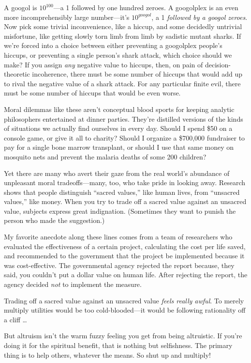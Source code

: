 {
 A googol is $10^{100}$---a 1 followed by one
hundred zeroes. A googolplex is an even more incomprehensibly large
number---it's $10^{googol}$, a 1
\textit{followed by a googol zeroes}. Now pick some trivial
inconvenience, like a hiccup, and some decidedly untrivial misfortune,
like getting slowly torn limb from limb by sadistic mutant sharks. If
we're forced into a choice between either preventing a
googolplex people's hiccups, or preventing a single
person's shark attack, which choice should we make? If
you assign \textit{any} negative value to hiccups, then, on pain of
decision-theoretic incoherence, there must be some number of hiccups
that would add up to rival the negative value of a shark attack. For
any particular finite evil, there must be some number of hiccups that
would be even worse.}

{
 Moral dilemmas like these aren't conceptual blood
sports for keeping analytic philosophers entertained at dinner parties.
They're distilled versions of the kinds of situations
we actually find ourselves in every day. Should I spend \$50 on a
console game, or give it all to charity? Should I organize a \$700,000
fundraiser to pay for a single bone marrow transplant, or should I use
that same money on mosquito nets and prevent the malaria deaths of some
200 children?}

{
 Yet there are many who avert their gaze from the real
world's abundance of unpleasant moral tradeoffs---many,
too, who take pride in looking away. Research shows that people
distinguish ``sacred values,'' like
human lives, from ``unsacred
values,'' like money. When you try to trade off a
sacred value against an unsacred value, subjects express great
indignation. (Sometimes they want to punish the person who made the
suggestion.)}

{
 My favorite anecdote along these lines comes from a team of
researchers who evaluated the effectiveness of a certain project,
calculating the cost per life saved, and recommended to the government
that the project be implemented because it was cost-effective. The
governmental agency rejected the report because, they said, you
couldn't put a dollar value on human life. After
rejecting the report, the agency decided \textit{not} to implement the
measure.}

{
 Trading off a sacred value against an unsacred value \textit{feels
really awful}. To merely multiply utilities would be too
cold-blooded---it would be following rationality off a cliff \ldots}

{
 But altruism isn't the warm fuzzy feeling you get
from being altruistic. If you're doing it for the
spiritual benefit, that is nothing but selfishness. The primary thing
is to help others, whatever the means. So shut up and multiply!}

